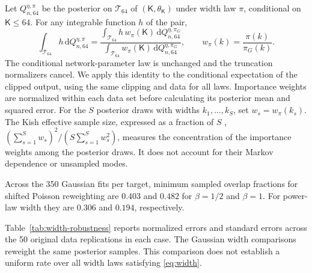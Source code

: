 \documentclass[11pt,a4paper]{article}
\theoremstyle{remark}
\begin{document}
Let $Q_{n,64}^{\eta,\pi}$ be the posterior on $\mathcal T_{64}$ of
$(\mathsf K,\theta_{\mathsf K})$ under width law $\pi$,
conditional on $\mathsf K\leq64$.
For any integrable function $h$ of the pair,
\begin{equation}\label{eq:simulation-width-reweight}
\int_{\mathcal T_{64}} h\,\mathrm d Q_{n,64}^{\eta,\pi}
=\frac{\int_{\mathcal T_{64}} h\,w_\pi(\mathsf K)
\,\mathrm d Q_{n,64}^{\eta,\pi_G}}
{\int_{\mathcal T_{64}} w_\pi(\mathsf K)
\,\mathrm d Q_{n,64}^{\eta,\pi_G}},\qquad
w_\pi(k)=\frac{\pi(k)}{\pi_G(k)}.
\end{equation}
The conditional network-parameter law is unchanged and the truncation
normalizers cancel. We apply this identity to the conditional
expectation of the clipped output, using the same clipping and data
for all laws. Importance weights are normalized within each data set
before calculating its posterior mean and squared error.
For the $S$ posterior draws with widths $k_1,\ldots,k_S$, set
$w_s=w_\pi(k_s)$. The Kish effective sample size, expressed as a
fraction of $S$ \citep[pp.~190--191]{kish1992},
$(\sum_{s=1}^{S}w_s)^2/(S\sum_{s=1}^{S}w_s^2)$,
measures the concentration of the importance weights among the posterior
draws. It does not account for their Markov dependence or unsampled modes.

{Across the 350 Gaussian fits per target, minimum sampled overlap fractions for shifted Poisson reweighting are $0.403$ and $0.482$ for $\beta=1/2$ and $\beta=1$. For power-law width they are $0.306$ and $0.194$, respectively.}

Table~\ref{tab:width-robustness} reports normalized errors and standard errors across the 50 original data replications in each case. The Gaussian width comparisons reweight the same posterior samples. This comparison does not establish a uniform rate over all width laws satisfying \eqref{eq:width}.
\end{document}
